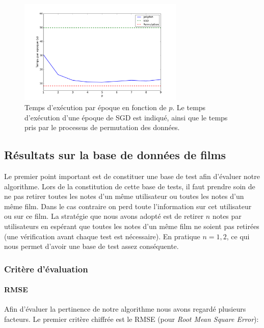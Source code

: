 \documentclass[10pt,a4paper]{article}
\begin{document}
\begin{figure}
\centering
\includegraphics[width=0.7\textwidth]{fig/time_jel1}
\caption{Temps d'exécution par époque en fonction de $p$. Le temps d'exécution d'une époque de SGD est indiqué, ainsi que le temps pris par le processus de permutation des données.}
\label{time}
\end{figure}


\subsection{Résultats sur la base de données de films}

Le premier point important est de constituer une base de test afin d'évaluer notre algorithme. Lors de la constitution de cette base de tests, il faut prendre soin de ne pas retirer toutes les notes d'un même utilisateur ou toutes les notes d'un même film. Dans le cas contraire on perd toute l'information sur cet utilisateur ou sur ce film. La stratégie que nous avons adopté est de retirer $n$ notes par utilisateurs en espérant que toutes les notes d'un même film ne soient pas retirées (une vérification avant chaque test est nécessaire). En pratique $n=1,2$, ce qui nous permet d'avoir une base de test assez conséquente.

\subsubsection*{Critère d'évaluation}

\paragraph{RMSE}

Afin d'évaluer la pertinence de notre algorithme nous avons regardé plusieurs facteurs. Le premier critère chiffrée est le RMSE (pour \textit{Root Mean Square Error}):
\end{document}
